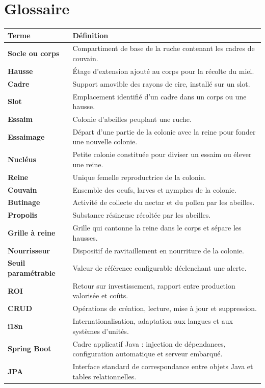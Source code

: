 \chapter{Glossaire}
\begin{xltabular}{\textwidth}{>{\bfseries}p{4cm} X}
\toprule
\textbf{Terme} & \textbf{Définition} \\
\midrule
\endhead
Socle ou corps & Compartiment de base de la ruche contenant les cadres de couvain. \\
Hausse & Étage d'extension ajouté au corps pour la récolte du miel. \\
Cadre & Support amovible des rayons de cire, installé sur un slot. \\
Slot & Emplacement identifié d'un cadre dans un corps ou une hausse. \\
Essaim & Colonie d'abeilles peuplant une ruche. \\
Essaimage & Départ d'une partie de la colonie avec la reine pour fonder une nouvelle colonie. \\
Nucléus & Petite colonie constituée pour diviser un essaim ou élever une reine. \\
Reine & Unique femelle reproductrice de la colonie. \\
Couvain & Ensemble des oeufs, larves et nymphes de la colonie. \\
Butinage & Activité de collecte du nectar et du pollen par les abeilles. \\
Propolis & Substance résineuse récoltée par les abeilles. \\
Grille à reine & Grille qui cantonne la reine dans le corps et sépare les hausses. \\
Nourrisseur & Dispositif de ravitaillement en nourriture de la colonie. \\
Seuil paramétrable & Valeur de référence configurable déclenchant une alerte. \\
ROI & Retour sur investissement, rapport entre production valorisée et coûts. \\
CRUD & Opérations de création, lecture, mise à jour et suppression. \\
i18n & Internationalisation, adaptation aux langues et aux systèmes d'unités. \\
Spring Boot & Cadre applicatif Java : injection de dépendances, configuration automatique et serveur embarqué. \\
JPA & Interface standard de correspondance entre objets Java et tables relationnelles. \\

\end{xltabular}
